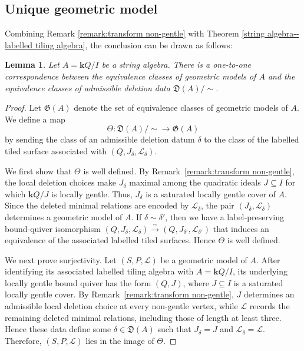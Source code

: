 \documentclass[11pt]{amsart}
\numberwithin{equation}{section}
\newtheorem{lemma}[theorem]{Lemma}
\theoremstyle{definition}
\begin{document}
\subsection{Unique geometric model}


Combining Remark \ref{remark:transform non-gentle} with Theorem \ref{string algebra--labelled tiling algebra}, the conclusion can be drawn as follows:
\begin{lemma}\label{Lem:geo-unique}
	Let $A = \mathbf{k}Q/I$ be a string algebra. There is a one-to-one correspondence between the equivalence classes of geometric models of $A$ and the equivalence classes of admissible deletion data $\mathfrak{D}(A)/\sim$. 
\end{lemma}

\begin{proof}
Let $\mathfrak{G}(A)$ denote the set of equivalence classes of geometric models of $A$. We define a map
\[
\Theta\colon \mathfrak{D}(A)/{\sim}\longrightarrow \mathfrak{G}(A)
\]
by sending the class of an admissible deletion datum $\delta$ to the
class of the labelled tiled surface associated with $(Q,J_\delta,\mathcal L_\delta)$.

We first show that $\Theta$ is well defined. By Remark~\ref{remark:transform non-gentle}, the local deletion
choices make \(J_\delta\) maximal among the quadratic ideals \(J\subseteq I\) for which \(\mathbf{k}Q/J\) is locally gentle. Thus, \(J_\delta\) is a saturated locally gentle cover of \(A\). Since the deleted minimal relations are encoded by \(\mathcal L_\delta\), the pair \((J_\delta,\mathcal L_\delta)\) determines a geometric model of \(A\). If \(\delta\sim\delta'\), then we have a label‑preserving bound‑quiver isomorphism \((Q,J_\delta,\mathcal L_\delta) \xrightarrow{\sim} (Q,J_{\delta'},\mathcal L_{\delta'})\) that induces an equivalence of the associated labelled tiled surfaces. Hence \(\Theta\) is well defined.


We next prove surjectivity. Let \((S,P,\mathcal L)\) be a geometric model of \(A\). After identifying its associated labelled tiling algebra with \(A=\mathbf{k}Q/I\), its underlying locally gentle bound quiver has the form \((Q,J)\), where \(J\subseteq I\) is a saturated locally gentle cover. By Remark~\ref{remark:transform non-gentle}, \(J\) determines an admissible local deletion choice at every non-gentle vertex, while \(\mathcal L\) records the remaining deleted minimal relations, including those of length at least three. Hence these data define some \(\delta\in\mathfrak D(A)\) such that
$J_\delta=J$ and $\mathcal L_\delta=\mathcal L$.
Therefore, \((S,P,\mathcal L)\) lies in the image of \(\Theta\).


\end{proof}
\end{document}
